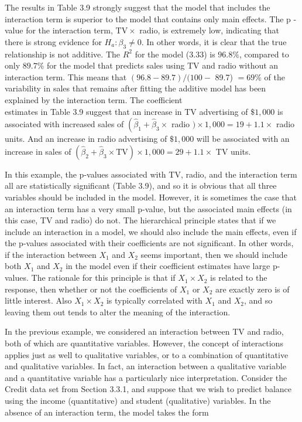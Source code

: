 \documentclass[10pt]{article}
\begin{document}
The results in Table 3.9 strongly suggest that the model that includes the interaction term is superior to the model that contains only main effects. The p -value for the interaction term, $\mathrm{TV} \times$ radio, is extremely low, indicating that there is strong evidence for $H_{a}: \beta_{3} \neq 0$. In other words, it is clear that the true relationship is not additive. The $R^{2}$ for the model (3.33) is $96.8 \%$, compared to only $89.7 \%$ for the model that predicts sales using TV and radio without an interaction term. This means that $(96.8-89.7) /(100-$ 89.7) $=69 \%$ of the variability in sales that remains after fitting the additive model has been explained by the interaction term. The coefficient\\
estimates in Table 3.9 suggest that an increase in TV advertising of $\$ 1,000$ is associated with increased sales of $\left(\hat{\beta}_{1}+\hat{\beta}_{3} \times\right.$ radio $) \times 1,000=19+1.1 \times$ radio units. And an increase in radio advertising of $\$ 1,000$ will be associated with an increase in sales of $\left(\hat{\beta}_{2}+\hat{\beta}_{3} \times \mathrm{TV}\right) \times 1,000=29+1.1 \times$ TV units.

In this example, the p-values associated with TV, radio, and the interaction term all are statistically significant (Table 3.9), and so it is obvious that all three variables should be included in the model. However, it is sometimes the case that an interaction term has a very small p-value, but the associated main effects (in this case, TV and radio) do not. The hierarchical principle states that if we include an interaction in a model, we should also include the main effects, even if the p-values associated with their coefficients are not significant. In other words, if the interaction between $X_{1}$ and $X_{2}$ seems important, then we should include both $X_{1}$ and $X_{2}$ in the model even if their coefficient estimates have large p-values. The rationale for this principle is that if $X_{1} \times X_{2}$ is related to the response, then whether or not the coefficients of $X_{1}$ or $X_{2}$ are exactly zero is of little interest. Also $X_{1} \times X_{2}$ is typically correlated with $X_{1}$ and $X_{2}$, and so leaving them out tends to alter the meaning of the interaction.

In the previous example, we considered an interaction between TV and radio, both of which are quantitative variables. However, the concept of interactions applies just as well to qualitative variables, or to a combination of quantitative and qualitative variables. In fact, an interaction between a qualitative variable and a quantitative variable has a particularly nice interpretation. Consider the Credit data set from Section 3.3.1, and suppose that we wish to predict balance using the income (quantitative) and student (qualitative) variables. In the absence of an interaction term, the model takes the form
\end{document}
